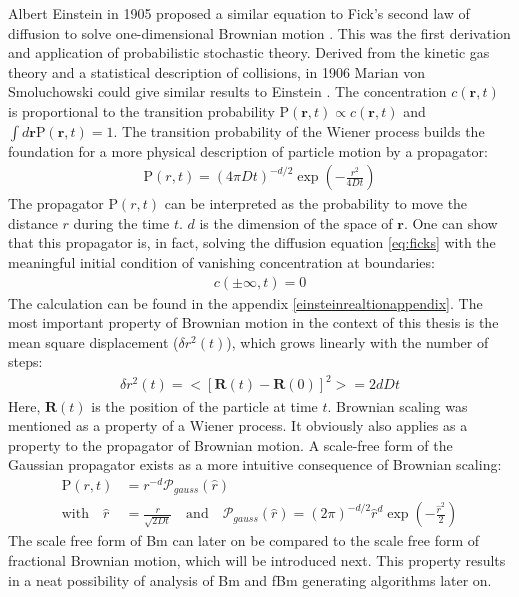 \documentclass[
  a4paper,BCOR10mm,oneside,
  headsepline,footsepline,%
  fleqn,openbib
]{scrbook}
\begin{document}
Albert Einstein in 1905 proposed a similar equation to Fick's second law of diffusion to solve one-dimensional Brownian motion \cite{Einstein1905}. This was the first derivation and application of probabilistic stochastic theory. Derived from the kinetic gas theory and a statistical description of collisions, in 1906 Marian von Smoluchowski could give similar results to Einstein \cite{vonSmoluchowski1906}. The concentration $c(\bm{r},t)$ is proportional to the transition probability $\mathrm{P}(\bm{r},t) \propto c(\bm{r},t)$ and  $\int d\bm{r}\mathrm{P}(\bm{r},t)=1$. The transition probability of the Wiener process builds the foundation for a more physical description of particle motion by a propagator:
\begin{align}
 \mathrm{P}(r,t)=  \left(4 \pi D t\right)^{-d/2} \exp \left(- \frac{r^2}{4 D t} \right) \label{propagator}
\end{align}
The propagator $\mathrm{P}(r,t)$ can be interpreted as the probability to move the distance $r$ during the time $t$. $d$ is the dimension of the space of $\bm{r}$. One can show that this propagator is, in fact, solving the diffusion equation \cref{eq:ficks} with the meaningful initial condition of vanishing concentration at boundaries: 
\begin{align}
c(\pm \infty,t)=0
\end{align}
The calculation can be found in the appendix \ref{einsteinrealtionappendix}. The most important property of Brownian motion in the context of this thesis  is the mean square displacement ($\delta r^2(t)$), which grows linearly with the number of steps: 
\begin{align}
\delta r^2(t)=<[\bm{R}(t)-\bm{R}(0)]^2>= 2dDt                                                                                                                                                                                                                                                                                                                                \end{align}
Here, $\bm{R}(t)$ is the position of the particle at time $t$.
Brownian scaling was mentioned as a property of a Wiener process. It obviously also applies as a property to the propagator of Brownian motion. A scale-free form of the Gaussian propagator exists as a more intuitive consequence of Brownian scaling: 
\begin{align}
\mathrm{P}(r,t)&= r^{-d} \mathcal{P}_{gauss}(\hat{r}) \\ \text{with} \quad \hat{r} &= \frac{r}{\sqrt{2Dt}} \quad \text{and} \quad \mathcal{P}_{gauss}(\hat{r})= (2 \pi)^{-d/2}  \hat{r}^d \exp \left(- \frac{\hat{r}^2}{2} \right) \label{scalefreeform} 
\end{align}
The scale free form of Bm can later on be compared to the scale free form of fractional Brownian motion, which will be introduced next. This property results in a neat possibility of analysis of Bm and fBm generating algorithms later on.
\end{document}
